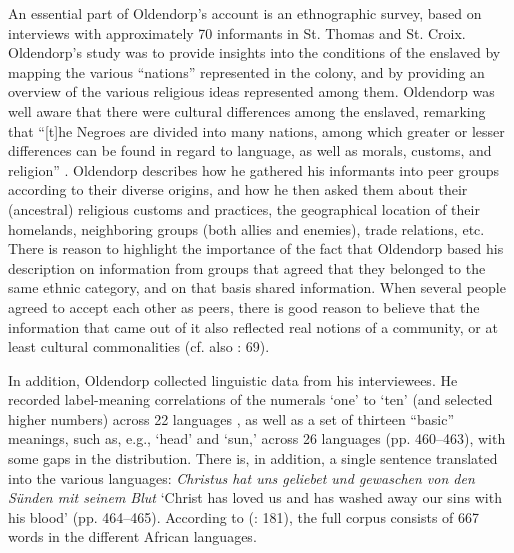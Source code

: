 \documentclass[output=paper,colorlinks,citecolor=brown]{langscibook}
\begin{document}
An essential part of Oldendorp’s account is an ethnographic survey, based on interviews with approximately 70 informants in St. Thomas and St. Croix. Oldendorp’s study was to provide insights into the conditions of the enslaved by mapping the various “nations” represented in the colony, and by providing an overview of the various religious ideas represented among them. Oldendorp was well aware that there were cultural differences among the enslaved, remarking that “[t]he Negroes are divided into many nations, among which greater or lesser differences can be found in regard to language, as well as morals, customs, and religion” \citep[160]{Highfield_1987}. Oldendorp describes how he gathered his informants into peer groups according to their diverse origins, and how he then asked them about their (ancestral) religious customs and practices, the geographical location of their homelands, neighboring groups (both allies and enemies), trade relations, etc. There is reason to highlight the importance of the fact that Oldendorp based his description on information from groups that agreed that they belonged to the same ethnic category, and on that basis shared information. When several people agreed to accept each other as peers, there is good reason to believe that the information that came out of it also reflected real notions of a community, or at least cultural commonalities (cf. also \cite{Sebro_2010}: 69).

In addition, Oldendorp collected linguistic data from his interviewees. He recorded label-meaning correlations of the numerals ‘one’ to ‘ten’ (and selected higher numbers) across 22 languages \citep[cf.][458--460]{Oldendorp_2000}, as well as a set of thirteen ``basic'' meanings, such as, e.g., `head' and `sun,' across 26 languages (pp. 460--463), with some gaps in the distribution. There is, in addition, a single sentence translated into the various languages: \emph{Christus hat uns geliebet und gewaschen von den Sünden mit seinem Blut} ‘Christ has loved us and has washed away our sins with his blood’ (pp. 464--465). According to \citeauthor{Jones_2010} (\citeyear{Jones_2010}: 181), the full corpus consists of 667 words in the different African languages.
\end{document}
